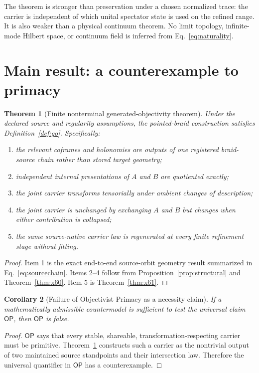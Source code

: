 \documentclass[11pt]{article}
\newtheorem{theorem}{Theorem}[section]
\newtheorem{corollary}[theorem]{Corollary}
\theoremstyle{definition}
\theoremstyle{remark}
\newcommand{\OPT}{\mathsf{OP}}
\begin{document}
The theorem is stronger than preservation under a chosen normalized trace: the carrier is independent of which unital spectator state is used on the refined range. It is also weaker than a physical continuum theorem. No limit topology, infinite-mode Hilbert space, or continuum field is inferred from Eq.~\eqref{eq:naturality}.

\section{Main result: a counterexample to primacy}

\begin{theorem}[Finite nonterminal generated-objectivity theorem]\label{thm:main}
Under the declared source and regularity assumptions, the pointed-braid construction satisfies Definition~\ref{def:go}. Specifically:
\begin{enumerate}
\item the relevant coframes and holonomies are outputs of one registered braid-source chain rather than stored target geometry;
\item independent internal presentations of $A$ and $B$ are quotiented exactly;
\item the joint carrier transforms tensorially under ambient changes of description;
\item the joint carrier is unchanged by exchanging $A$ and $B$ but changes when either contribution is collapsed;
\item the same source-native carrier law is regenerated at every finite refinement stage without fitting.
\end{enumerate}
\end{theorem}

\begin{proof}
Item 1 is the exact end-to-end source-orbit geometry result summarized in Eq.~\eqref{eq:sourcechain}. Items 2--4 follow from Proposition~\ref{prop:structural} and Theorem~\ref{thm:x60}. Item 5 is Theorem~\ref{thm:x61}.
\end{proof}

\begin{corollary}[Failure of Objectivist Primacy as a necessity claim]\label{cor:counterexample}
If a mathematically admissible countermodel is sufficient to test the universal claim $\OPT$, then $\OPT$ is false.
\end{corollary}

\begin{proof}
$\OPT$ says that every stable, shareable, transformation-respecting carrier must be primitive. Theorem~\ref{thm:main} constructs such a carrier as the nontrivial output of two maintained source standpoints and their intersection law. Therefore the universal quantifier in $\OPT$ has a counterexample.
\end{proof}
\end{document}
